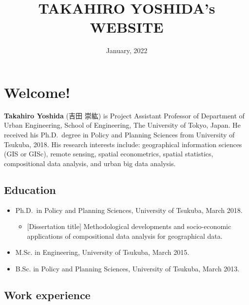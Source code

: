 \documentclass[]{book}
\title{TAKAHIRO YOSHIDA's WEBSITE}
\author{}
\date{January, 2022}
\providecommand{\tightlist}{%
  \setlength{\itemsep}{0pt}\setlength{\parskip}{0pt}}
\begin{document}
\maketitle

{
\setcounter{tocdepth}{1}
\tableofcontents
}
\hypertarget{welcome}{%
\chapter*{Welcome!}\label{welcome}}

\textbf{Takahiro Yoshida} (吉田 崇紘) is Project Assistant Professor of Department of Urban Engineering, School of Engineering, The University of Tokyo, Japan. He received his Ph.D.~degree in Policy and Planning Sciences from University of Tsukuba, 2018. His research interests include: geographical information sciences (GIS or GISc), remote sensing, spatial econometrics, spatial statistics, compositional data analysis, and urban big data analysis.

\hypertarget{education}{%
\section*{Education}\label{education}}

\begin{itemize}
\tightlist
\item
  Ph.D.~in Policy and Planning Sciences, University of Tsukuba, March 2018.

  \begin{itemize}
  \tightlist
  \item
    {[}Dissertation title{]} Methodological developments and socio-economic applications of compositional data analysis for geographical data.
  \end{itemize}
\item
  M.Sc. in Engineering, University of Tsukuba, March 2015.
\item
  B.Sc. in Policy and Planning Sciences, University of Tsukuba, March 2013.
\end{itemize}

\hypertarget{work-experience}{%
\section*{Work experience}\label{work-experience}}
\end{document}
